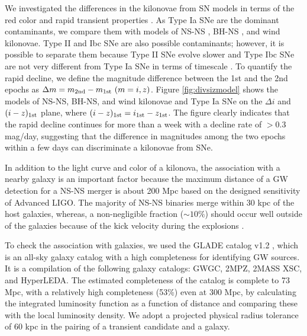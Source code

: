 \documentclass[]{pasj01}
\begin{document}
We investigated the differences in the kilonovae from SN models
in terms of the red color and rapid transient properties \citep[also see][]{2015ApJ...814...25C}.
As Type Ia SNe are the dominant contaminants,
we compare them with models of NS-NS \citep{2013ApJ...775..113T}, BH-NS \citep{2014ApJ...780...31T}, and wind \citep{2016AdAst2016E...8T}
kilonovae.
Type II and Ibc SNe are also possible contaminants; however, it is possible to separate them because
Type II SNe evolve slower \citep[e.g.,][]{2014MNRAS.442..844F}
and Type Ibc SNe are not very different from Type Ia SNe in terms of timescale
\citep[e.g.,][]{2010ApJS..190..418G,2014ApJ...794...23D}.
To quantify the rapid decline, we define the magnitude difference
between the 1st  and the 2nd epochs as $\Delta m = m_{\rm 2nd} - m_{\rm 1st}~(m=i, z)$.
Figure \ref{fig:divsizmodel} shows the models of NS-NS, BH-NS,  and wind kilonovae and Type Ia SNe
on the $\Delta i$ and $(i-z)_{\rm 1st}$ plane, where $(i-z)_{\rm 1st} = i_{\rm 1st} - z_{\rm 1st}$.
The figure clearly indicates that the rapid decline continues
for more than a week with a decline rate of $>0.3$ mag/day,
suggesting that the difference in magnitudes among the two
epochs within a few days can discriminate a kilonovae from SNe.

In addition to the light curve and color of a kilonova,
the association with a nearby galaxy is an important factor
\citep{2016ApJ...820..136G,2016ApJ...829L..15S}
because the maximum distance of a GW detection for a NS-NS merger is
about 200 Mpc based on the designed sensitivity of Advanced LIGO.
The majority of NS-NS binaries merge within 30 kpc of the host galaxies, whereas, 
a non-negligible fraction ($\sim10\%$) should occur well outside of
the galaxies because of the kick velocity during the explosions
\citep[\cite{1999MNRAS.305..763B}, see][for a recent review]{2014ARA&A..52...43B}.

To check the association with galaxies, we used the GLADE catalog v1.2 \citep{2016yCat.7275....0D},
which is an all-sky galaxy catalog with a high completeness for identifying GW sources.
It is a compilation of the following galaxy catalogs: GWGC, 2MPZ, 2MASS XSC, and HyperLEDA.
The estimated completeness of the catalog is complete to 73 Mpc,
with a relatively high completeness (53\%) even at 300 Mpc,
by calculating the integrated luminosity function as a function of distance and comparing these with the local luminosity density.
We adopt a projected physical radius tolerance of 60 kpc in the pairing of a transient candidate and a galaxy.
\end{document}
